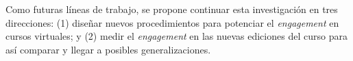 \documentclass[spanish]{textolivre}
\begin{document}
Como futuras líneas de trabajo, se propone continuar esta investigación en tres direcciones: (1) diseñar nuevos procedimientos para potenciar el \emph{engagement} en cursos virtuales; y (2)  medir el \emph{engagement} en las nuevas ediciones del curso para así comparar y llegar a posibles generalizaciones.


\printbibliography\label{sec-bib}
\end{document}
